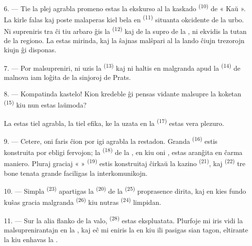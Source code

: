 \VUsaut{3.0mm}
\VUsaut{3.0mm}

6. --- Tie la plej agrabla promeno estas la ekskurso al la kaskado
\textsuperscript{(10)} de « Kaŭ ». La  kirle falas kaj poste
malaperas kiel bela  en 
\textsuperscript{(11)} situanta okcidente de la urbo. Ni supreniris tra ĉi tiu
arbaro ĝis la  \textsuperscript{(12)} kaj de
la supro de la , ni ekvidis la tutan  de la
regiono. La  estas mirinda, kaj la  ŝajnas
malŝpari al la lando ĉiujn trezorojn kiujn ĝi disponas.

7. --- Por malsupreniri, ni uzis la 
\textsuperscript{(13)} kaj ni haltis en malgranda  apud la
 \textsuperscript{(14)} de malnova 
iam loĝita de la sinjoroj de Prats.

8. --- Kompatinda kastelo! Kion kredeble ĝi pensas vidante malsupre la koketan
 \textsuperscript{(15)} kiu nun estas 
laŭmoda?

La  estas tiel agrabla, la  tiel efika,
ke la  uzata en la  \textsuperscript{(17)}
estas vera plezuro.

\VUsaut{3.0mm}
\VUsaut{3.0mm}

9. --- Cetere, oni faris ĉion por igi agrabla la restadon. Granda
 \textsuperscript{(16)} estis konstruita por ebligi fervojon;
la  \textsuperscript{(18)} de la , en kiu
oni , estas aranĝita en ĉarma maniero. Pluraj graciaj
«  » \textsuperscript{(19)} estis konstruitaj ĉirkaŭ la kazino
\textsuperscript{(21)}, kaj  \textsuperscript{(22)} tre bone
tenata grande faciligas la interkomunikojn.

10. --- Simpla  \textsuperscript{(23)} apartigas la 
\textsuperscript{(20)} de la  \textsuperscript{(25)} proprasence
dirita, kaj en kies fundo kuŝas gracia malgranda 
\textsuperscript{(26)} kiu nutras  \textsuperscript{(24)}
limpidan.

11. --- Sur la alia flanko de la valo,  \textsuperscript{(28)}
estas ekspluatata. Plurfoje mi iris vidi la 
malsuprenirantajn en la , kaj eĉ mi eniris la 
en kiu ili pasigas sian tagon, eltirante la  kiu enhavas la
.

